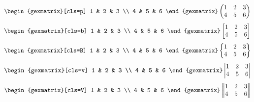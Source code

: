 \documentclass{article}
\begin{document}
\begin{equation*}
    \begin{gexmatrix}[cls=p]
        1 & 2 & 3 \\
        4 & 5 & 6
    \end{gexmatrix}
    \begin{pmatrix}
        1 & 2 & 3 \\
        4 & 5 & 6
    \end{pmatrix}
\end{equation*}
\begin{equation*}
    \begin{gexmatrix}[cls=b]
        1 & 2 & 3 \\
        4 & 5 & 6
    \end{gexmatrix}
    \begin{bmatrix}
        1 & 2 & 3 \\
        4 & 5 & 6
    \end{bmatrix}
\end{equation*}
\begin{equation*}
    \begin{gexmatrix}[cls=B]
        1 & 2 & 3 \\
        4 & 5 & 6
    \end{gexmatrix}
    \begin{Bmatrix}
        1 & 2 & 3 \\
        4 & 5 & 6
    \end{Bmatrix}
\end{equation*}
\begin{equation*}
    \begin{gexmatrix}[cls=v]
        1 & 2 & 3 \\
        4 & 5 & 6
    \end{gexmatrix}
    \begin{vmatrix}
        1 & 2 & 3 \\
        4 & 5 & 6
    \end{vmatrix}
\end{equation*}
\begin{equation*}
    \begin{gexmatrix}[cls=V]
        1 & 2 & 3 \\
        4 & 5 & 6
    \end{gexmatrix}
    \begin{Vmatrix}
        1 & 2 & 3 \\
        4 & 5 & 6
    \end{Vmatrix}
\end{equation*}
\end{document}
